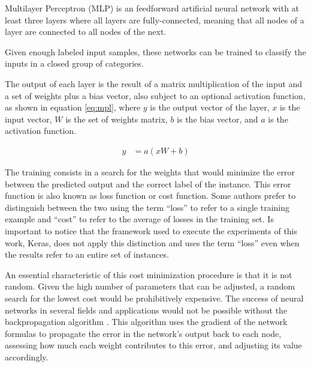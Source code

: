 Multilayer Perceptron (MLP)\cite{rosenblatt_perceptron:_1958} is an feedforward artificial neural network with at least three layers where all layers are fully-connected, meaning that all nodes of a layer are connected to all nodes of the next.

Given enough labeled input samples, these networks can be trained to classify the inputs in a closed group of categories.

The output of each layer is the result of a matrix multiplication of the input and a set of weights plus a bias vector, also subject to an optional activation function, as shown in equation \ref{eq:mpl}, where $y$ is the output vector of the layer, $x$ is the input vector, $W$ is the set of weights matrix, $b$ is the bias vector, and $a$ is the activation function.

\begin{align}
\label{eq:mpl}     
y &= a(x W + b)
\end{align}


The training consists in a search for the weights that would minimize the error between the predicted output and the correct label of the instance. This error function is also known as loss function or cost function. Some authors prefer to distinguish between the two using the term ``loss'' to refer to a single training example and ``cost'' to refer to the average of losses in the training set. Is important to notice that the framework used to execute the experiments of this work, Keras, does not apply this distinction and uses the term ``loss'' even when the results refer to an entire set of instances.

An essential characteristic of this cost minimization procedure is that it is not random. Given the high number of parameters that can be adjusted, a random search for the lowest cost would be prohibitively expensive. The success of neural networks in several fields and applications would not be possible without the backpropagation algorithm \cite{rumelhart_general_1986}. This algorithm uses the gradient of the network formulas to propagate the error in the network's output back to each node, assessing how much each weight contributes to this error, and adjusting its value accordingly.